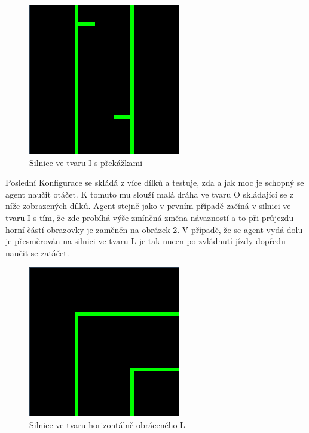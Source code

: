\begin{figure}[H]
	\centering
	\includegraphics[scale=0.6]{pieces/I_with_obstructions}
	\caption{Silnice ve tvaru I s překážkami}
	\label{fig:iwithobstructions}
\end{figure}

Poslední Konfigurace se skládá z více dílků a testuje, zda a jak moc je schopný se agent naučit otáčet. K tomuto mu slouží malá dráha ve tvaru O skládající se z níže zobrazených dílků. Agent stejně jako v prvním případě začíná v silnici ve tvaru I s tím, že zde probíhá výše zmíněná změna návazností a to při průjezdu horní částí obrazovky je zaměněn na obrázek \ref{fig:upsidel}. V případě, že se agent vydá dolu je přesměrován na silnici ve tvaru L je tak nucen po zvládnutí jízdy dopředu naučit se zatáčet.

\begin{figure}[H]
	\centering
	\includegraphics[scale=0.6]{pieces/upside_L}
	\caption{Silnice ve tvaru horizontálně obráceného L}
	\label{fig:upsidel}
\end{figure}

